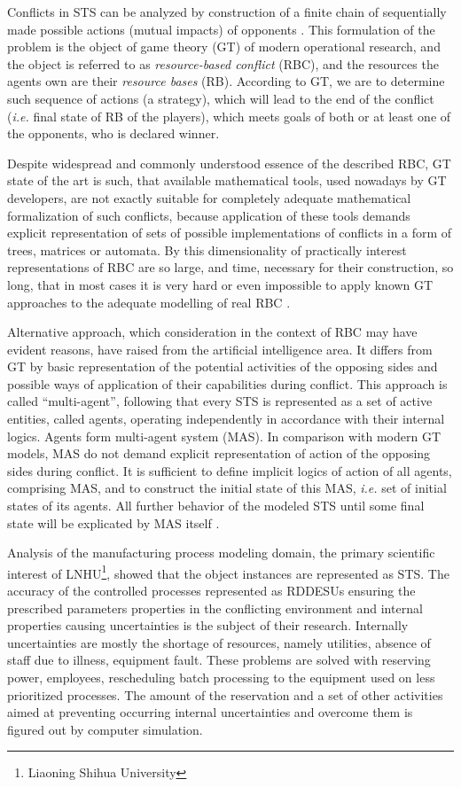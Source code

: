\documentclass[runningheads]{llncs}
\begin{document}
Conflicts in STS can be analyzed by construction of a finite chain of sequentially made possible actions (mutual impacts) of opponents \cite{rbg}. This formulation of the problem is the object of game theory (GT) of modern operational research, and the object is referred to as \emph{resource-based conflict} (RBC), and the resources the agents own are their \emph{resource bases} (RB). According to GT, we are to determine such sequence of actions (a strategy), which will lead to the end of the conflict (\emph{i.e.} final state of RB of the players), which meets goals of both or at least one of the opponents, who is declared winner.

Despite widespread and commonly understood essence of the described RBC, GT state of the art is such, that available mathematical tools, used nowadays by GT developers, are not exactly suitable for completely adequate mathematical formalization of such conflicts, because application of these tools demands explicit representation of sets of possible implementations of conflicts in a form of trees, matrices or automata. By this dimensionality of practically interest representations of RBC are so large, and time, necessary for their construction, so long, that in most cases it is very hard or even impossible to apply known GT approaches to the adequate modelling of real RBC \cite{rbg}.

Alternative approach, which consideration in the context of RBC may have evident reasons, have raised from the artificial intelligence area. It differs from GT by basic representation of the potential activities of the opposing sides and possible ways of application of their capabilities during conflict. This approach is called “multi-agent”, following that every STS is represented as a set of active entities, called agents, operating independently in accordance with their internal logics. Agents form multi-agent system (MAS). In comparison with modern GT models, MAS do not demand explicit representation of action of the opposing sides during conflict. It is sufficient to define implicit logics of action of all agents, comprising MAS, and to construct the initial state of this MAS, \emph{i.e.} set of initial states of its agents. All further behavior of the modeled STS until some final state will be explicated by MAS itself \cite{rbg}.

Analysis of the manufacturing process modeling domain, the primary scientific interest of LNHU\footnote{Liaoning Shihua University}, showed that the object instances are represented as STS. The accuracy of the controlled processes represented as RDDESUs ensuring the prescribed parameters properties in the conflicting environment and internal properties causing uncertainties is the subject of their research. Internally uncertainties are mostly the shortage of resources, namely utilities, absence of staff due to illness, equipment fault.  These problems are solved with reserving power, employees, rescheduling batch processing to the equipment used on less prioritized processes.  The amount of the reservation and a set of other activities aimed at preventing occurring internal uncertainties and overcome them is figured out by computer simulation.
\end{document}
